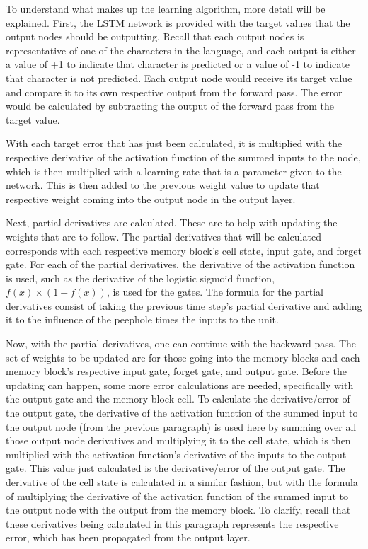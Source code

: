 \documentclass[11pt,letterpaper]{article}
\begin{document}
To understand what makes up the learning algorithm, more detail will be explained. First, the LSTM network is provided with the target values that the output nodes should be outputting. Recall that each output nodes is representative of one of the characters in the language, and each output is either a value of +1 to indicate that character is predicted or a value of -1 to indicate that character is not predicted. Each output node would receive its target value and compare it to its own respective output from the forward pass. The error would be calculated by subtracting the output of the forward pass from the target value.

With each target error that has just been calculated, it is multiplied with the respective derivative of the activation function of the summed inputs to the node, which is then multiplied with a learning rate that is a parameter given to the network. This is then added to the previous weight value to update that respective weight coming into the output node in the output layer.

Next, partial derivatives are calculated. These are to help with updating the weights that are to follow. The partial derivatives that will be calculated corresponds with each respective memory block's cell state, input gate, and forget gate. For each of the partial derivatives, the derivative of the activation function is used, such as the derivative of the logistic sigmoid function, $f(x) \times (1 - f(x))$, is used for the gates. The formula for the partial derivatives consist of taking the previous time step's partial derivative and adding it to the influence of the peephole times the inputs to the unit.

Now, with the partial derivatives, one can continue with the backward pass. 
The set of weights to be updated are for those going into the memory blocks and each memory block's respective input gate, forget gate, and output gate. Before the updating can happen, some more error calculations are needed, specifically with the output gate and the memory block cell. To calculate the derivative/error of the output gate, the derivative of the activation function of the summed input to the output node (from the previous paragraph) is used here by summing over all those output node derivatives and multiplying it to the cell state, which is then multiplied with the activation function's derivative of the inputs to the output gate. This value just calculated is the derivative/error of the output gate. The derivative of the cell state is calculated in a similar fashion, but with the formula of multiplying the derivative of the activation function of the summed input to the output node with the output from the memory block. To clarify, recall that these derivatives being calculated in this paragraph represents the respective error, which has been propagated from the output layer.
\end{document}
